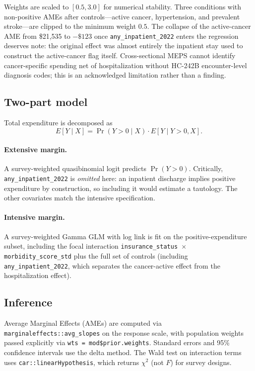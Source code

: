 \documentclass[11pt,a4paper]{article}
\begin{document}
Weights are scaled to $[0.5, 3.0]$ for numerical stability. Three conditions with non-positive AMEs after controls---active cancer, hypertension, and prevalent stroke---are clipped to the minimum weight $0.5$. The collapse of the active-cancer AME from \$21{,}535 to $-\$123$ once \texttt{any\_inpatient\_2022} enters the regression deserves note: the original effect was almost entirely the inpatient stay used to construct the active-cancer flag itself. Cross-sectional MEPS cannot identify cancer-specific spending net of hospitalization without HC-242B encounter-level diagnosis codes; this is an acknowledged limitation rather than a finding.

\subsection{Two-part model}

Total expenditure is decomposed as
\[
E[Y \mid X] = \Pr(Y > 0 \mid X) \cdot E[Y \mid Y > 0, X].
\]

\paragraph{Extensive margin.} A survey-weighted quasibinomial logit predicts $\Pr(Y > 0)$. Critically, \texttt{any\_inpatient\_2022} is \emph{omitted} here: an inpatient discharge implies positive expenditure by construction, so including it would estimate a tautology. The other covariates match the intensive specification.

\paragraph{Intensive margin.} A survey-weighted Gamma GLM with log link is fit on the positive-expenditure subset, including the focal interaction \texttt{insurance\_status $\times$ morbidity\_score\_std} plus the full set of controls (including \texttt{any\_inpatient\_2022}, which separates the cancer-active effect from the hospitalization effect).

\subsection{Inference}

Average Marginal Effects (AMEs) are computed via \texttt{marginaleffects::avg\_slopes} on the response scale, with population weights passed explicitly via \texttt{wts = mod\$prior.weights}. Standard errors and 95\% confidence intervals use the delta method. The Wald test on interaction terms uses \texttt{car::linearHypothesis}, which returns $\chi^2$ (not $F$) for survey designs.
\end{document}
